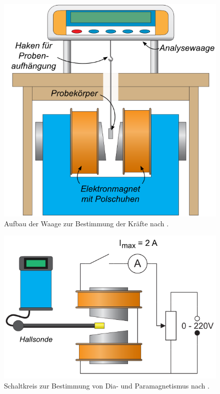 \documentclass[12pt,a4paper,titlepage,headinclude,bibtotoc]{scrartcl}
\begin{document}
\begin{figure}[h]
	\centering
	\includegraphics{aufbau}
	\caption{Aufbau der Waage zur Bestimmung der Kräfte nach \cite[15.11.14, 14 Uhr]{LP15}.}
	\label{fig:aufbau}
\end{figure}
\begin{figure}[h]
	\centering
	\includegraphics{schaltkreis}
	\caption{Schaltkreis zur Bestimmung von Dia- und Paramagnetismus nach \cite[15.11.14, 14 Uhr]{LP15}.}
	\label{fig:schaltkreis}
\end{figure}
\end{document}
